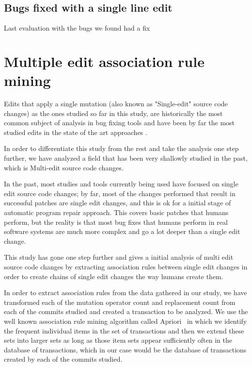 \documentclass[conference]{IEEEtran}
\begin{document}
\subsection{Bugs fixed with a single line edit}
Last evaluation with the bugs we found had a fix




\section{Multiple edit association rule mining}

Edits that apply a single mutation (also known as "Single-edit" source code changes) as the ones studied so far in this study, are historically the most common subject of analysis in bug fixing tools and have been by far the most studied edits in the state of the art approaches \cite{Qi15,fan15,kim2013,Long2016,legoues12,Qi13,Qi14,xuan16}.

In order to differentiate this study from the rest and take the analysis one step further, we have analyzed a field that has been very shallowly studied in the past, which is Multi-edit source code changes.

In the past, most studies and tools currently being used have focused on single edit source code changes; by far, most of the changes performed that result in successful patches are single edit changes, and this is ok for a initial stage of automatic program repair approach. This covers basic patches that humans perform, but the reality is that most bug fixes that humans perform in real software systems are much more complex and go a lot deeper than a single edit change. 

This study has gone one step further and gives a initial analysis of multi edit source code changes by extracting association rules between single edit changes in order to create chains of single edit changes the way humans create them.

In order to extract association rules from the data gathered in our study, we have transformed each of the mutation operator count and replacement count from each of the commits studied and created a transaction to be analyzed. We use the well known association rule mining algorithm called Apriori~\cite{Agrawal94,Liu98,Zaki2000} in which we identify the frequent individual items in the set of transactions and then we extend these sets into larger sets as long as those item sets appear sufficiently often in the database of transactions, which in our case would be the database of transactions created by each of the commits studied.
\end{document}
